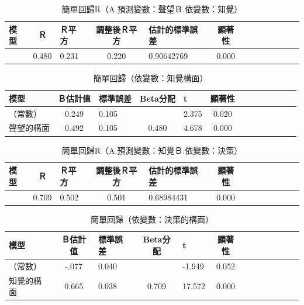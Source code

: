\begin{table}[H]
\caption{簡單回歸R（A.預測變數：聲望Ｂ.依變數：知覺）}
\label{tab:HR2}
\centering
\renewcommand{\arraystretch}{1.2} %
\arrayrulewidth=1pt               %
\tabcolsep=10pt                   %
\begin{tabular}[t]{lclclclclclcl}  %
\hline
 模型&Ｒ&Ｒ平方&調整後Ｒ平方&估計的標準誤差&顯著性\\
\hline
&0.480&0.231&0.220&0.90642769&0.000\\
\hline
\end{tabular}
\end{table}

\begin{table}[H]
\caption{簡單回歸（依變數：知覺構面）}
\label{tab:H2}
\centering
\renewcommand{\arraystretch}{1.2} %
\arrayrulewidth=1pt               %
\tabcolsep=10pt                   %
\begin{tabular}[t]{lclclclclclcl}  %
\hline
 模型&Ｂ估計值&標準誤差&Beta分配&t&顯著性\\
\hline
（常數）&0.249&0.105&&2.375&0.020\\
聲望的構面&0.492&0.105&0.480&4.678&0.000\\
\hline
\end{tabular}
\end{table}


\begin{table}[H]
\caption{簡單回歸R（A.預測變數：知覺Ｂ.依變數：決策）}
\label{tab:HR3}
\centering
\renewcommand{\arraystretch}{1.2} %
\arrayrulewidth=1pt               %
\tabcolsep=10pt                   %
\begin{tabular}[t]{lclclclclclcl}  %
\hline
 模型&Ｒ&Ｒ平方&調整後Ｒ平方&估計的標準誤差&顯著性\\
\hline
&0.709&0.502&0.501&0.68984431&0.000\\
\hline
\end{tabular}
\end{table}


\begin{table}[H]
\caption{簡單回歸（依變數：決策的構面）}
\label{tab:H3}
\centering
\renewcommand{\arraystretch}{1.2} %
\arrayrulewidth=1pt               %
\tabcolsep=10pt                   %
\begin{tabular}[t]{lclclclclclcl}  %
\hline
 模型&Ｂ估計值&標準誤差&Beta分配&t&顯著性\\
\hline
（常數）&-.077&0.040& &-1.949&0.052\\
知覺的構面&0.665&0.038&0.709&17.572&0.000\\
\hline
\end{tabular}
\end{table}

